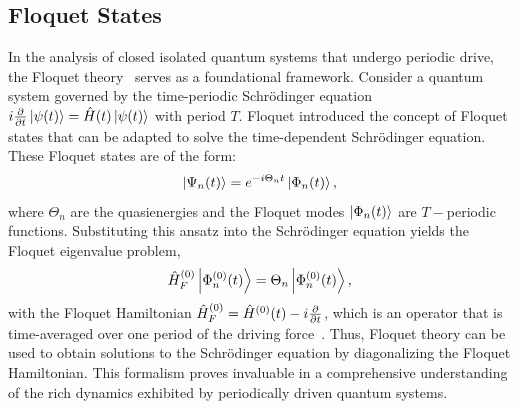 \documentclass[preprint,5p,times,twocolumn]{elsarticle}
\begin{document}
\subsection{Floquet States}
\label{subsec:floquet:states}
In the analysis of closed isolated quantum systems that undergo periodic drive, the Floquet theory~\citep{Floquet} serves as a foundational framework. Consider a quantum system governed by the time-periodic Schr\"odinger equation $i \pdv{}{t}\ket{\psi(t)} = \hat{H}(t) \ket{\psi(t)}$ with period $T$. Floquet introduced the concept of Floquet states that can be adapted to solve the time-dependent Schrödinger equation. These Floquet states are of the form:
\begin{equation}
    \ket{\Psi_n(t)} = e^{-i\Theta_n t} \ket{\Phi_n(t)},
\end{equation}
where $\Theta_n$ are the quasienergies and the Floquet modes
$\ket{\Phi_n(t)}$ are $T-$periodic functions. Substituting this ansatz into the Schr\"odinger equation yields the Floquet eigenvalue problem,
\begin{equation}
    \hat{H}^{(0)}_F \ket{\Phi^{(0)}_n(t)} = \Theta_n \ket{\Phi^{(0)}_n(t)},
\end{equation}
with the Floquet Hamiltonian $\hat{H}^{(0)}_F = \hat{H}^{(0)}(t) - i \pdv{t}$, which is an operator that is time-averaged over one period of the driving force~\citep{reichl}. Thus, Floquet theory can be used to obtain solutions to the Schr\"odinger equation by diagonalizing the Floquet Hamiltonian. This formalism proves invaluable in a comprehensive understanding of the rich dynamics exhibited by periodically driven quantum systems.
\end{document}
